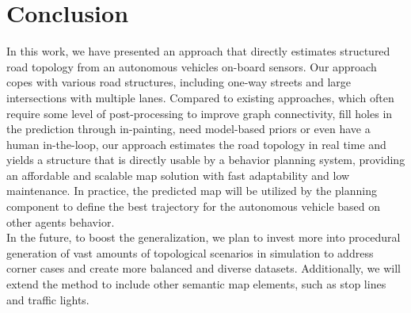 \documentclass[10pt,twocolumn,letterpaper]{article}
\begin{document}
\section{Conclusion}
In this work, we have presented an approach that directly estimates structured road topology from an autonomous vehicle\textquotesingle s on-board sensors. Our approach copes with various road structures, including one-way streets and large intersections with multiple lanes. Compared to existing approaches, which often require some level of post-processing to improve graph connectivity, fill holes in the prediction through in-painting, need model-based priors or even have a human in-the-loop, our approach estimates the road topology in real time and yields a structure that is directly usable by a behavior planning system, providing an affordable and scalable map solution with fast adaptability and low maintenance. In practice, the predicted map will be utilized by the planning component to  define the best trajectory for the autonomous vehicle based on other agent\textquotesingle s behavior.\\
In the future, to boost the generalization, we plan to invest more into procedural generation of vast amounts of topological scenarios in simulation to address corner cases and create more balanced and diverse datasets. Additionally, we will extend the method to include other semantic map elements, such as stop lines and traffic lights.
\clearpage
\balance
{\small


}
\end{document}

